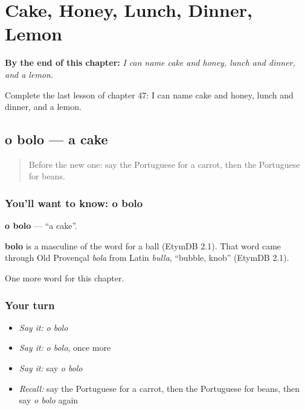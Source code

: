 
\chapter{Cake, Honey, Lunch, Dinner, Lemon}
\label{ch:pt-cake-honey-lunch-dinner-lemon}

\begin{chapteropening}
\textbf{By the end of this chapter:} \emph{I can name cake and honey, lunch and dinner, and a lemon.}

Complete the last lesson of chapter 47: I can name cake and honey, lunch and dinner, and a lemon.
\end{chapteropening}

\section[o bolo]{o bolo — a cake}

\label{lesson:PT-C47-bolo}



\begin{quote}
Before the new one: say the Portuguese for a carrot, then the Portuguese for beans.
\end{quote}

\subsection*{You'll want to know: o bolo}
\textbf{o bolo} — \textquotedblleft{}a cake\textquotedblright{}.

\begin{cousinweb}
\textbf{bolo} is a masculine of the word for a ball (EtymDB 2.1). That word came through Old Provençal \emph{bola} from Latin \emph{bulla}, \textquotedblleft{}bubble, knob\textquotedblright{} (EtymDB 2.1).
\end{cousinweb}

\begin{grammarlens}[title={What you've built}]
One more word for this chapter.
\end{grammarlens}

\subsection*{Your turn}
\begin{itemize}
\raggedright
  \item \emph{Say it:} \emph{o bolo}
  \item \emph{Say it:} \emph{o bolo}, once more
  \item \emph{Say it:} say \emph{o bolo}
  \item \emph{Recall:} say the Portuguese for a carrot, then the Portuguese for beans, then say \emph{o bolo} again
\end{itemize}

